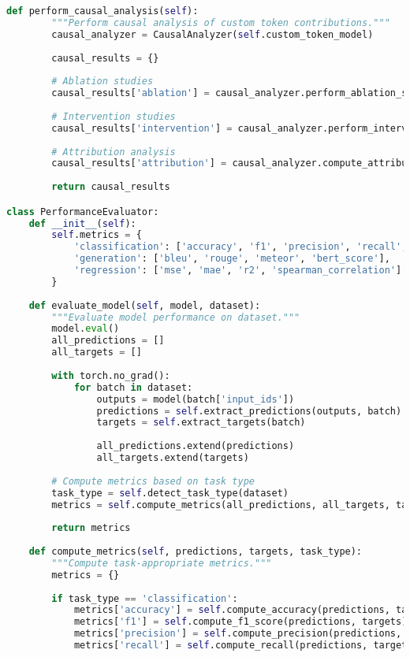 \begin{lstlisting}[language=Python, caption=Comprehensive evaluation framework for custom tokens]
    def perform_causal_analysis(self):
        """Perform causal analysis of custom token contributions."""
        causal_analyzer = CausalAnalyzer(self.custom_token_model)
        
        causal_results = {}
        
        # Ablation studies
        causal_results['ablation'] = causal_analyzer.perform_ablation_study()
        
        # Intervention studies
        causal_results['intervention'] = causal_analyzer.perform_intervention_study()
        
        # Attribution analysis
        causal_results['attribution'] = causal_analyzer.compute_attribution_scores()
        
        return causal_results

class PerformanceEvaluator:
    def __init__(self):
        self.metrics = {
            'classification': ['accuracy', 'f1', 'precision', 'recall', 'auc'],
            'generation': ['bleu', 'rouge', 'meteor', 'bert_score'],
            'regression': ['mse', 'mae', 'r2', 'spearman_correlation']
        }
    
    def evaluate_model(self, model, dataset):
        """Evaluate model performance on dataset."""
        model.eval()
        all_predictions = []
        all_targets = []
        
        with torch.no_grad():
            for batch in dataset:
                outputs = model(batch['input_ids'])
                predictions = self.extract_predictions(outputs, batch)
                targets = self.extract_targets(batch)
                
                all_predictions.extend(predictions)
                all_targets.extend(targets)
        
        # Compute metrics based on task type
        task_type = self.detect_task_type(dataset)
        metrics = self.compute_metrics(all_predictions, all_targets, task_type)
        
        return metrics
    
    def compute_metrics(self, predictions, targets, task_type):
        """Compute task-appropriate metrics."""
        metrics = {}
        
        if task_type == 'classification':
            metrics['accuracy'] = self.compute_accuracy(predictions, targets)
            metrics['f1'] = self.compute_f1_score(predictions, targets)
            metrics['precision'] = self.compute_precision(predictions, targets)
            metrics['recall'] = self.compute_recall(predictions, targets)
            

\end{lstlisting}
